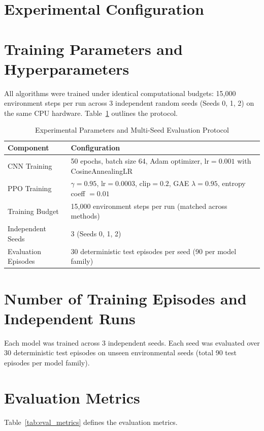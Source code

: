 \documentclass[12pt,a4paper]{report}
\begin{document}
\section{Experimental Configuration}
\section{Training Parameters and Hyperparameters}
All algorithms were trained under identical computational budgets: 15,000 environment steps per run across 3 independent random seeds (Seeds 0, 1, 2) on the same CPU hardware. Table~\ref{tab:eval_protocol} outlines the protocol.

\begin{table}[H]
\centering
\caption{Experimental Parameters and Multi-Seed Evaluation Protocol}
\label{tab:eval_protocol}
\begin{tabular}{ll}
\toprule
\textbf{Component} & \textbf{Configuration} \\
\midrule
CNN Training & 50 epochs, batch size 64, Adam optimizer, $\text{lr} = 0.001$ with CosineAnnealingLR \\
PPO Training & $\gamma = 0.95$, $\text{lr} = 0.0003$, $\text{clip} = 0.2$, GAE $\lambda = 0.95$, entropy coeff $= 0.01$ \\
Training Budget & 15,000 environment steps per run (matched across methods) \\
Independent Seeds & 3 (Seeds 0, 1, 2) \\
Evaluation Episodes & 30 deterministic test episodes per seed (90 per model family) \\
\bottomrule
\end{tabular}
\end{table}

\section{Number of Training Episodes and Independent Runs}
Each model was trained across 3 independent seeds. Each seed was evaluated over 30 deterministic test episodes on unseen environmental seeds (total 90 test episodes per model family).

\section{Evaluation Metrics}
Table~\ref{tab:eval_metrics} defines the evaluation metrics.
\end{document}
